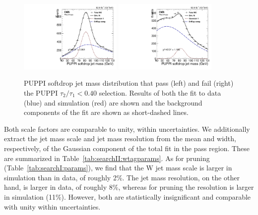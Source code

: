 \begin{figure}[h!]
\centering
\includegraphics[width=0.44\textwidth]{figures/vtagging/AN-16-342/model_TotalMC_em_powheg.pdf}
\includegraphics[width=0.44\textwidth]{figures/vtagging/AN-16-342/model_TotalMC_failtau2tau1cut_em_powheg.pdf}\\
\caption{PUPPI softdrop jet mass distribution that pass (left) and fail (right) the PUPPI $\tau_2 / \tau_1 < 0.40$ selection. Results of both the fit to data (blue) and simulation (red) are shown and the background components of the fit are shown as short-dashed lines.}
\label{fig:searchII:simfit}
\end{figure}

Both scale factors are comparable to unity, within uncertainties. We additionally extract the jet mass scale and jet mass resolution from the mean and width, respectively, of the Gaussian
component of the total fit in the pass region. These are summarized in Table~\ref{tab:searchII:wtagparams}.  As for pruning (Table~\ref{tab:searchI:params}), we find that the W jet mass scale is larger in simulation than in data, of roughly 2\%.
The jet mass resolution, on the other hand, is larger in data, of roughly 8\%, whereas for pruning the resolution is larger in simulation (11\%). However, both are statistically insignificant and comparable with unity within uncertainties.

